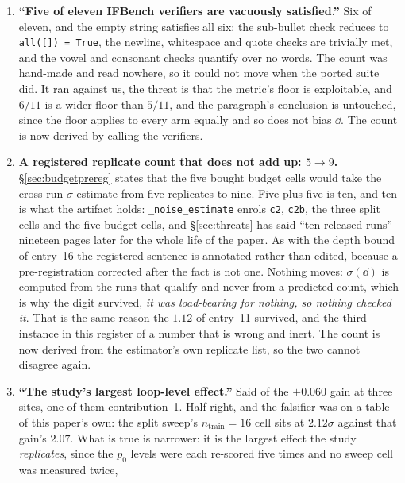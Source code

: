 \documentclass[11pt]{article}
\begin{document}
\begin{enumerate}
    that withdraws the unconditional low-$p_0$ claim, so the digit is not load-bearing, the
    withdrawal is, but a table and its own prose disagreeing is exactly what a reader is
    entitled to assume cannot happen.
  \item \textbf{``Five of eleven IFBench verifiers are vacuously satisfied.''} Six of eleven, and
    the empty string satisfies all six: the sub-bullet check reduces to
    \texttt{all([]) = True}, the newline, whitespace and quote checks are trivially met, and the
    vowel and consonant checks quantify over no words. The count was hand-made and read nowhere, so
    it could not move when the ported suite did. It ran against us, the threat is that the
    metric's floor is exploitable, and $6/11$ is a wider floor than $5/11$, and the paragraph's
    conclusion is untouched, since the floor applies to every arm equally and so does not bias
    $\dd$. The count is now derived by calling the verifiers.
  \item \textbf{A registered replicate count that does not add up: $5 \to 9$.}
    \S\ref{sec:budgetprereg} states that the five bought budget cells would take the cross-run
    $\sigma$ estimate from five replicates to nine. Five plus five is ten, and ten is what the
    artifact holds: \texttt{\_noise\_estimate} enrols \texttt{c2}, \texttt{c2b}, the three split
    cells and the five budget cells, and \S\ref{sec:threats} has said ``ten released runs''
    nineteen pages later for the whole life of the paper. As with the depth bound of entry~16 the
    registered sentence is annotated rather than edited, because a pre-registration corrected
    after the fact is not one. Nothing moves: $\sigma(\dd)$ is computed from the runs that
    qualify and never from a predicted count, which is why the digit survived, \emph{it was
    load-bearing for nothing, so nothing checked it}. That is the same reason the $1.12$ of
    entry~11 survived, and the third instance in this register of a number that is wrong and
    inert. The count is now derived from the estimator's own replicate list, so the two cannot
    disagree again.
  \item \textbf{``The study's largest loop-level effect.''} Said of the $+0.060$ gain at three
    sites, one of them contribution~1. Half right, and the falsifier was on a table of this paper's
    own: the split sweep's $n_{\mathrm{train}}{=}16$ cell sits at $2.12\sigma$ against that gain's
    $2.07$. What is true is narrower: it is the largest effect the study \emph{replicates},
    since the $p_0$ levels were each re-scored five times and no sweep cell was measured twice,

\end{enumerate}
\end{document}
